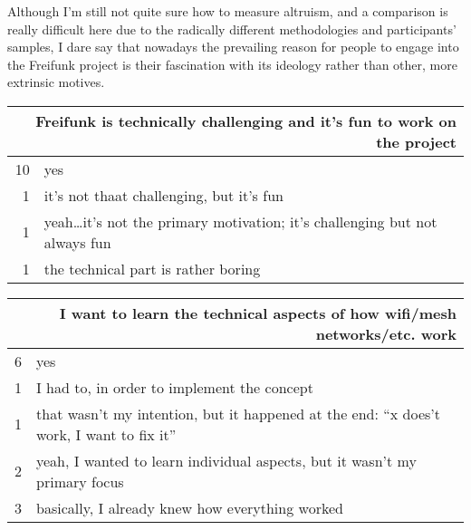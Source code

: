 
Although I'm still not quite sure how to measure altruism, and a comparison is really difficult here due to the radically different methodologies and participants' samples, I dare say that nowadays the prevailing reason for people to engage into the Freifunk project is their fascination with its ideology rather than other, more extrinsic motives.

\begin{table}[h]
  \begin{tabular}{| r | p{\textwidth} |}
    \hline
    \multicolumn{2}{|p{\textwidth}|}{Freifunk is technically challenging and it's fun to work on the project} \\
    \hline
    10 & yes \\
    1  & it's not thaat challenging, but it's fun \\
    1  & yeah\ldots it's not the primary motivation; it's challenging but not always fun \\
    1  & the technical part is rather boring \\
    \hline
  \end{tabular}
\end{table}

\begin{table}[h]
  \begin{tabular}{| r | p{\textwidth} |}
    \hline
    \multicolumn{2}{|p{\textwidth}|}{I want to learn the technical aspects of how wifi/mesh networks/etc. work} \\
    \hline
    6 & yes \\
    1 & I had to, in order to implement the concept \\
    1 & that wasn't my intention, but it happened at the end: ``x does't work, I want to fix it'' \\
    2 & yeah, I wanted to learn individual aspects, but it wasn't my primary focus \\
    3 & basically, I already knew how everything worked \\
    \hline
  \end{tabular}
\end{table}

